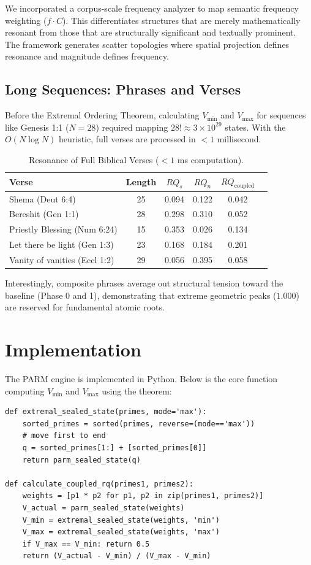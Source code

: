 \documentclass[12pt, a4paper]{article}
\begin{document}
We incorporated a corpus-scale frequency analyzer to map semantic frequency weighting ($f \cdot C$). This differentiates structures that are merely mathematically resonant from those that are structurally significant and textually prominent. The framework generates scatter topologies where spatial projection defines resonance and magnitude defines frequency.

\subsection{Long Sequences: Phrases and Verses}

Before the Extremal Ordering Theorem, calculating $V_{\min}$ and $V_{\max}$ for sequences like Genesis 1:1 ($N=28$) required mapping $28! \approx 3 \times 10^{29}$ states. With the $O(N \log N)$ heuristic, full verses are processed in $<1$ millisecond.

\begin{table}[h]
\centering
\caption{Resonance of Full Biblical Verses ($<1$ ms computation).}
\label{tab:longseq}
\begin{tabular}{lccccc}
\toprule
Verse & Length & $RQ_s$ & $RQ_n$ & $RQ_{\text{coupled}}$ \\
\midrule
Shema (Deut 6:4) & 25 & 0.094 & 0.122 & 0.042 \\
Bereshit (Gen 1:1) & 28 & 0.298 & 0.310 & 0.052 \\
Priestly Blessing (Num 6:24) & 15 & 0.353 & 0.026 & 0.134 \\
Let there be light (Gen 1:3) & 23 & 0.168 & 0.184 & 0.201 \\
Vanity of vanities (Eccl 1:2) & 29 & 0.056 & 0.395 & 0.058 \\
\bottomrule
\end{tabular}
\end{table}

Interestingly, composite phrases average out structural tension toward the baseline (Phase 0 and 1), demonstrating that extreme geometric peaks ($1.000$) are reserved for fundamental atomic roots.

\section{Implementation}

The PARM engine is implemented in Python. Below is the core function computing $V_{\min}$ and $V_{\max}$ using the theorem:

\begin{lstlisting}
def extremal_sealed_state(primes, mode='max'):
    sorted_primes = sorted(primes, reverse=(mode=='max'))
    # move first to end
    q = sorted_primes[1:] + [sorted_primes[0]]
    return parm_sealed_state(q)

def calculate_coupled_rq(primes1, primes2):
    weights = [p1 * p2 for p1, p2 in zip(primes1, primes2)]
    V_actual = parm_sealed_state(weights)
    V_min = extremal_sealed_state(weights, 'min')
    V_max = extremal_sealed_state(weights, 'max')
    if V_max == V_min: return 0.5
    return (V_actual - V_min) / (V_max - V_min)
\end{lstlisting}
\end{document}
